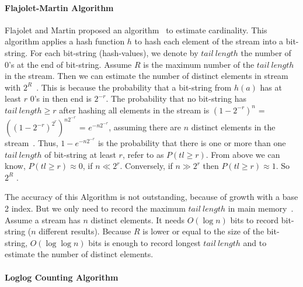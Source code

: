 \paragraph{Flajolet-Martin Algorithm}

Flajolet and Martin proposed an algorithm~\cite{flajolet1985probabilistic} to
estimate cardinality. This algorithm applies a hash function $h$ to hash each
element of the stream into a bit-string. For each bit-string (hash-values), we denote
by $tail\ length$ the number of 0's at the end of bit-string. Assume $R$ is the
maximum number of the $tail\ length$ in the stream. Then we can estimate the
number of distinct elements in stream with
$2^R$~\cite{flajolet1985probabilistic}. This is because the probability that a
bit-string from $h(a)$ has at least $r$ 0's in then end is $2^{-r}$. The
probability that no bit-string has $tail\ length \geqslant r$ after hashing all
elements in the stream is $(1-2^{-r})^n$ = $((1-2^{-r})^{2^r})^{n2^{-r}}$ =
$e^{-n2^{-r}}$, assuming there are $n$ distinct elements in the
stream~\cite{leskovec2014mining}. Thus, $1-e^{-n2^{-r}}$ is the probability that
there is one or more than one $tail\ length$ of bit-string at least $r$, refer
to as $P(tl \geqslant r)$. From above we can know, $P(tl \geqslant r) \approx
0$, if $n \ll 2^r$. Conversely, if $n \gg 2^r$ then $P(tl \geqslant r) \approx 1$. So
$2^{R}$ .

The accuracy of this Algorithm is not outstanding, because of growth with a base
2 index. But we only need to record the maximum $tail\ length$ in main
memory~\cite{leskovec2014mining}. Assume a stream has $n$ distinct elements. It
needs $O(\log n)$ bits to record bit-string ($n$ different results). Because $R$
is lower or equal to the size of the bit-string, $O(\log\log n)$ bits is enough to
record longest $tail\ length$ and to estimate the number of distinct elements. 
\paragraph{Loglog Counting Algorithm}

